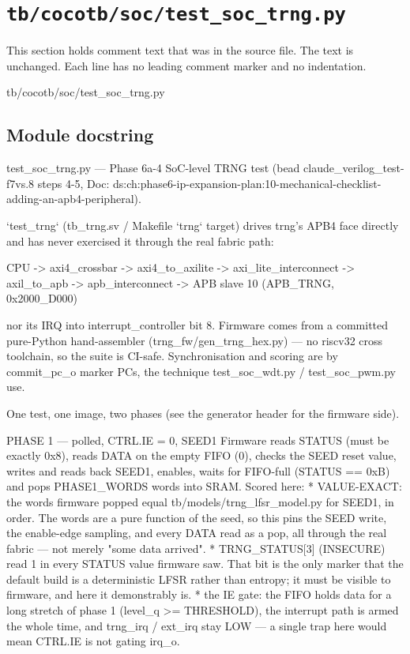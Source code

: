 \section{\texttt{tb/cocotb/soc/test\_soc\_trng.py}}\label{tm:suite:soc-test-soc-trng}

This section holds comment text that was in the source file. The text is unchanged. Each line has no leading comment marker and no indentation.

\begin{relocated}{tb/cocotb/soc/test_soc_trng.py}

\subsection*{Module docstring}

\begin{textblock}
test_soc_trng.py — Phase 6a-4 SoC-level TRNG test (bead claude_verilog_test-f7vs.8 steps 4-5,
Doc: ds:ch:phase6-ip-expansion-plan:10-mechanical-checklist-adding-an-apb4-peripheral).

`test_trng` (tb_trng.sv / Makefile `trng` target) drives trng's APB4 face directly and has never
exercised it through the real fabric path:

CPU -> axi4_crossbar -> axi4_to_axilite -> axi_lite_interconnect ->
axil_to_apb -> apb_interconnect -> APB slave 10 (APB_TRNG, 0x2000_D000)

nor its IRQ into interrupt_controller bit 8. Firmware comes from a committed pure-Python
hand-assembler (trng_fw/gen_trng_hex.py) — no riscv32 cross toolchain, so the suite is CI-safe.
Synchronisation and scoring are by commit_pc_o marker PCs, the technique test_soc_wdt.py /
test_soc_pwm.py use.

One test, one image, two phases (see the generator header for the firmware side).

PHASE 1 — polled, CTRL.IE = 0, SEED1
Firmware reads STATUS (must be exactly 0x8), reads DATA on the empty FIFO (0), checks the SEED
reset value, writes and reads back SEED1, enables, waits for FIFO-full (STATUS == 0xB) and pops
PHASE1_WORDS words into SRAM. Scored here:
* VALUE-EXACT: the words firmware popped equal tb/models/trng_lfsr_model.py for SEED1, in
order. The words are a pure function of the seed, so this pins the SEED write, the
enable-edge sampling, and every DATA read as a pop, all through the real fabric — not merely
"some data arrived".
* TRNG_STATUS[3] (INSECURE) read 1 in every STATUS value firmware saw. That bit is the only
marker that the default build is a deterministic LFSR rather than entropy; it must be
visible to firmware, and here it demonstrably is.
* the IE gate: the FIFO holds data for a long stretch of phase 1 (level_q >= THRESHOLD), the
interrupt path is armed the whole time, and trng_irq / ext_irq stay LOW — a single trap here
would mean CTRL.IE is not gating irq_o.


\end{textblock}
\end{relocated}
